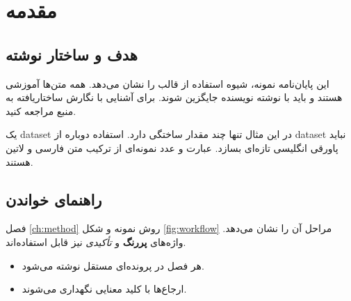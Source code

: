 \chapter{مقدمه}\label{ch:introduction}
\section{هدف و ساختار نوشته}
این پایان‌نامه نمونه، شیوه استفاده از قالب را نشان می‌دهد. همه متن‌ها آموزشی هستند و باید با نوشته نویسنده جایگزین شوند. برای آشنایی با نگارش ساختاریافته به منبع \cite{lamport1994} مراجعه کنید.

یک \gls{dataset} در این مثال تنها چند مقدار ساختگی دارد. استفاده دوباره از \gls{dataset} نباید پاورقی انگلیسی تازه‌ای بسازد. عبارت  و عدد  نمونه‌ای از ترکیب متن فارسی و لاتین هستند.
\section{راهنمای خواندن}
فصل \ref{ch:method} روش نمونه و شکل \ref{fig:workflow} مراحل آن را نشان می‌دهد. واژه‌های \textbf{پررنگ} و \emph{تأکیدی} نیز قابل استفاده‌اند.
\begin{itemize}
\item هر فصل در پرونده‌ای مستقل نوشته می‌شود.
\item ارجاع‌ها با کلید معنایی نگهداری می‌شوند.
\end{itemize}
